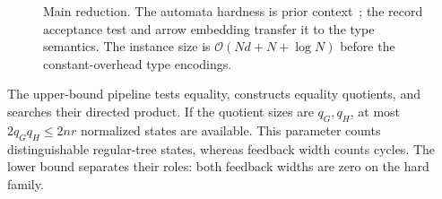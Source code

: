 \documentclass[11pt,letterpaper]{article}
\theoremstyle{definition}\newtheorem{definition}[theorem]{Definition}
\newcommand{\Sub}{\ensuremath{\preceq}}
\newcommand{\Oh}{\mathcal O}
\newcommand{\checkfield}{\mathsf c}
\begin{document}
\begin{figure}[H]
\centering
{}
\caption{Main reduction. The automata hardness is prior context~\cite{DDFMW25}; the record acceptance test and arrow embedding transfer it to the type semantics. The instance size is $\Oh(Nd+N+\log N)$ before the constant-overhead type encodings.}
\label{fig:reduction}
\end{figure}

The upper-bound pipeline tests equality, constructs equality quotients, and searches their directed product. If the quotient sizes are $q_G,q_H$, at most $2q_Gq_H\le 2nr$ normalized states are available. This parameter counts distinguishable regular-tree states, whereas feedback width counts cycles. The lower bound separates their roles: both feedback widths are zero on the hard family.
\end{document}
